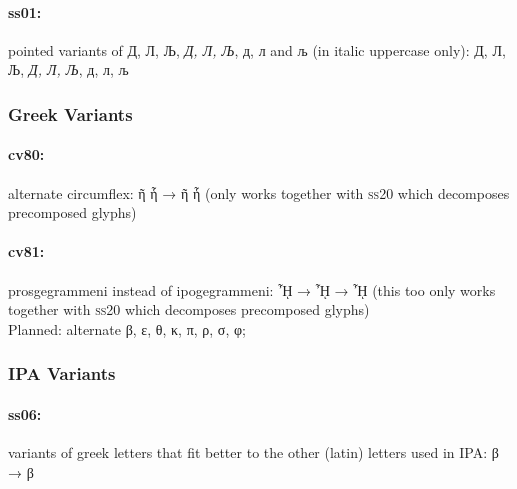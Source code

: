 \documentclass[pagesize,DIV14]{scrartcl}
\begin{document}
\paragraph*{ss01:} pointed variants of Д, Л, Љ, \textit{Д, Л, Љ}, д, л and љ (in italic uppercase only): { Д, Л, Љ, \textit{Д, Л, Љ}, д, л, љ 
}
{
\subsubsection{Greek Variants}
\paragraph*{cv80:} alternate circumflex: ῆ ἧ → {ῆ ἧ} (only works together with \textsc{ss20} which decomposes precomposed glyphs)
\paragraph*{cv81:} prosgegrammeni instead of ipogegrammeni: ᾞ → { ᾞ} → { ᾞ} (this too only works together with \textsc{ss20} which decomposes precomposed glyphs)\\
Planned: alternate β, ε, θ, κ, π, ρ, σ, φ;\\
}
\subsubsection{IPA Variants}
\paragraph*{ss06:} variants of greek letters that fit better to the other (latin) letters used in IPA: β → {β}

\clearpage
\end{document}

